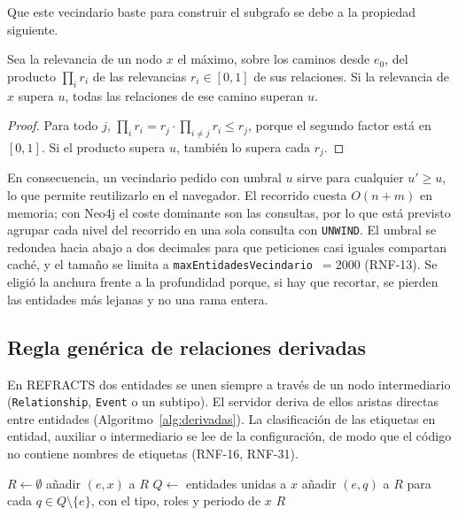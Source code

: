 Que este vecindario baste para construir el subgrafo se debe a la propiedad siguiente.

\begin{proposicion}
\label{prop:vecindario}
Sea la relevancia de un nodo $x$ el máximo, sobre los caminos desde $e_0$, del producto $\prod_{i} r_i$ de las relevancias $r_i\in[0,1]$ de sus relaciones. Si la relevancia de $x$ supera $u$, todas las relaciones de ese camino superan $u$.
\end{proposicion}

\begin{proof}
Para todo $j$, $\prod_i r_i = r_j\cdot\prod_{i\neq j} r_i \le r_j$, porque el segundo factor está en $[0,1]$. Si el producto supera $u$, también lo supera cada $r_j$.
\end{proof}

En consecuencia, un vecindario pedido con umbral $u$ sirve para cualquier $u'\ge u$, lo que permite reutilizarlo en el navegador. El recorrido cuesta $O(n+m)$ en memoria; con Neo4j el coste dominante son las consultas, por lo que está previsto agrupar cada nivel del recorrido en una sola consulta con \texttt{UNWIND}. El umbral se redondea hacia abajo a dos decimales para que peticiones casi iguales compartan caché, y el tamaño se limita a \texttt{maxEntidadesVecindario}~$=2000$ (RNF-13). Se eligió la anchura frente a la profundidad porque, si hay que recortar, se pierden las entidades más lejanas y no una rama entera. 

\subsection{Regla genérica de relaciones derivadas}
\label{sec:alg-derivadas}

En REFRACTS dos entidades se unen siempre a través de un nodo intermediario (\texttt{Relationship}, \texttt{Event} o un subtipo). El servidor deriva de ellos aristas directas entre entidades (Algoritmo~\ref{alg:derivadas}). La clasificación de las etiquetas en entidad, auxiliar o intermediario se lee de la configuración, de modo que el código no contiene nombres de etiquetas (RNF-16, RNF-31).

\begin{algorithm}[htbp]
  \caption{Relaciones derivadas de una entidad (\texttt{relaciones\_de}).}
  \label{alg:derivadas}
  \begin{algorithmic}[1]
      \State $R \gets \emptyset$
          \State añadir $(e, x)$ a $R$ 
          \State $Q \gets$ entidades unidas a $x$
            \State añadir $(e, q)$ a $R$ para cada $q \in Q\setminus\{e\}$, con el tipo, roles y periodo de $x$
          \EndIf
        \EndIf
      \EndFor
      \State \Return $R$
    \EndFunction
  \end{algorithmic}
\end{algorithm}

